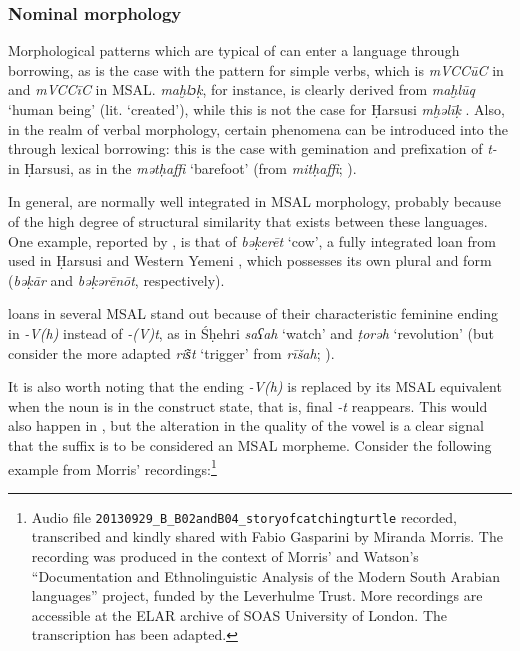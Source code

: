 \documentclass[output=paper]{langsci/langscibook}
\begin{document}
 \subsubsection{Nominal morphology}\label{sec:key:nomorph}

Morphological patterns which are typical of  can enter a language through borrowing, as is the case with the   pattern for simple verbs, which is \textit{mVCCūC} in  and \textit{mVCCīC} in MSAL.  \textit{maḫlɔḳ}, for instance, is clearly derived from  \textit{maḫlūq} ‘human being’ (lit. ‘created’), while this is not the case for Ḥarsusi \textit{mḫəlīḳ} \citep[299]{Lonnet2011}. Also, in the realm of verbal  morphology, certain phenomena can be introduced into the  through lexical borrowing: this is the case with gemination and prefixation of \textit{t-} in Ḥarsusi, as in the  \textit{mətḥaffi} ‘barefoot’ (from   \textit{mitḥaffi}; \citealt{Lonnet2011}).

In general,   are normally well integrated in MSAL morphology, probably because of the high degree of structural similarity that exists between these languages. One example, reported by \citet{Lonnet2011}, is that of \textit{bəḳerēt} ‘cow’, a fully integrated loan from  used in Ḥarsusi and {Western} {Yemeni} , which possesses its own plural and  form (\textit{bəḳār} and \textit{bəḳərēnōt}, respectively).

 loans in several MSAL stand out because of their characteristic feminine ending in \textit{-V(h)} instead of \textit{-(V)t}, as in Śḥehri \textit{saʕah} ‘watch’ and \textit{ṭorəh} ‘revolution’ (but consider the more adapted \textit{ris͂t} ‘trigger’ from   \textit{rīšah}; \citealt{Lonnet2011}). 

It is also worth noting that the  ending \textit{-V(h)} is replaced by its MSAL equivalent when the noun is in the construct state, that is, final \textit{-t} reappears. This would also happen in , but the alteration in the quality of the vowel is a clear signal that the suffix is to be considered an MSAL morpheme. Consider the following example from Morris’  recordings:\footnote{Audio 
  file \texttt{20130929\_B\_B02andB04\_storyofcatchingturtle} recorded, transcribed and kindly shared with Fabio Gasparini by Miranda Morris. The recording was produced in the context of Morris’ and Watson’s “Documentation and Ethnolinguistic Analysis of the Modern South Arabian languages” project, funded by the Leverhulme Trust. More recordings are accessible at the ELAR archive of SOAS University of London. The transcription has been adapted.
  }
\end{document}
